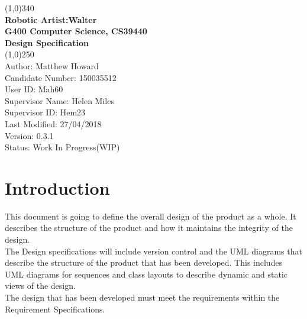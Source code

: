 \documentclass{article}
\begin{document}

    \begin{titlepage}

        \begin{center}

        \line(1,0){340}\\ 


        \large{\bfseries Robotic Artist:Walter} \\

        \large {\bfseries G400 Computer Science, CS39440 }\\
        
        \large {\bfseries Design Specification}\\


         \line(1,0){250}\\

         \textsf {Author: Matthew Howard \\
          Candidate Number: 150035512\\
          User ID: Mah60 \\
          Supervisor Name: Helen Miles \\
          Supervisor ID: Hem23\\
          Last Modified: 27/04/2018 \\
          Version: 0.3.1\\
          Status: Work In Progress(WIP)} \\

        \end{center}        

    \end{titlepage}
  
    \clearpage

     \tableofcontents
     
     \clearpage

    \section{Introduction}
This document is going to define the overall design of the product as a whole. It describes the structure of the product and how it maintains the integrity of the design.\\ \newline
The Design specifications will include version control and the UML diagrams that describe the structure of the product that has been developed. This includes UML diagrams for sequences and class layouts to describe dynamic and static views of the design. 
\\ \newline
The design that has been developed must meet the requirements within the Requirement Specifications.\cite{Requirement_specifications}
\end{document}
